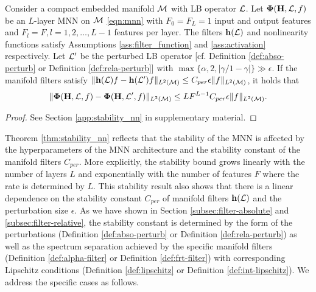 \begin{theorem}\label{thm:stability_nn}
Consider a compact embedded manifold ${\mathcal M}$ with LB operator ${\mathcal L}$. Let $\bm\Phi({\mathbf H},{\mathcal L},f)$ be an $L$-layer MNN on ${\mathcal M}$ \eqref{eqn:mnn} with $F_0=F_L=1$ input and output features and $F_l=F,l=1,2,\hdots,L-1$ features per layer. 
The filters ${\mathbf h}({\mathcal L})$ and nonlinearity functions satisfy  Assumptions \ref{ass:filter_function} and \ref{ass:activation} respectively. Let ${\mathcal L}'$ be the perturbed LB operator [cf. Definition \ref{def:abso-perturb} or Definition \ref{def:rela-perturb}] with $\max\{\alpha, 2, |\gamma/1-\gamma|\}\gg \epsilon$. If the manifold filters satisfy $\| {\mathbf h}({\mathcal L})f -{\mathbf h}({\mathcal L}')f \|_{L^2({\mathcal M})}\leq C_{per} \epsilon \|f\|_{L^2({\mathcal M})}$, it holds that
\begin{align}\label{eqn:stability_nn}
   \nonumber \|\bm\Phi({\mathbf H},{\mathcal L},f)-\bm\Phi({\mathbf H},{\mathcal L}',f)\|_{L^2({\mathcal M})} \leq LF^{L-1}C_{per}\epsilon \|f\|_{L^2({\mathcal M})}.
 \end{align}
\end{theorem}
\begin{proof}
See Section \ref{app:stability_nn} in supplementary material.
\end{proof}

Theorem \ref{thm:stability_nn} reflects that the stability of the MNN is affected by the hyperparameters of the MNN architecture and the stability constant of the manifold filters $C_{per}$. More explicitly, the stability bound grows linearly with the number of layers $L$ and exponentially with the number of features $F$ where the rate is determined by $L$. This stability result also shows that there is a linear dependence on the stability constant $C_{per}$ of manifold filters ${\mathbf h}({\mathcal L})$ and the perturbation size $\epsilon$. As we have shown in Section \ref{subsec:filter-absolute} and \ref{subsec:filter-relative}, the stability constant is determined by the form of the perturbations (Definition \ref{def:abso-perturb} or Definition \ref{def:rela-perturb}) as well as the spectrum separation achieved by the specific manifold filters (Definition \ref{def:alpha-filter} or Definition \ref{def:frt-filter}) with corresponding Lipschitz conditions (Definition \ref{def:lipschitz} or Definition \ref{def:int-lipschitz}). We address the specific cases as follows.

